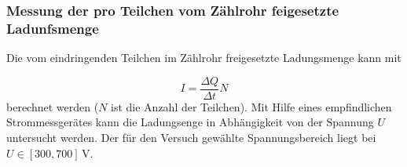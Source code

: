 \subsubsection{Messung der pro Teilchen vom Zählrohr feigesetzte Ladunfsmenge} %
Die vom eindringenden Teilchen im Zählrohr freigesetzte Ladungsmenge kann mit

\begin{equation}
  \label{eq:lafung_pro_teilchen}
  I=\frac{\Delta Q}{\Delta t} N
\end{equation}
berechnet werden ($N$ ist die Anzahl der Teilchen).
Mit Hilfe eines empfindlichen Strommessgerätes
kann die Ladungsenge in Abhängigkeit von der Spannung $U$ untersucht werden.
Der für den Versuch gewählte Spannungsbereich liegt bei $U\in\left[300, 700\right] \, \si{\volt}$.
